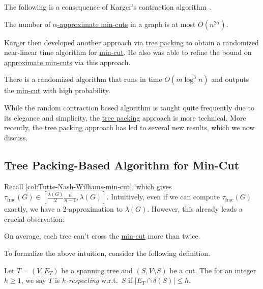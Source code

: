The following is a consequence of Karger's contraction algorithm~\cite{karger1995random}.

\begin{theorem}\label{thm:number-approximate-min-cut}
	The number of \hyperref[def:approximate-min-cut]{\(\alpha \)-approximate min-cuts} in a graph is at most \(O(n^{2 \alpha })\).
\end{theorem}

Karger then developed another approach via \hyperref[prb:TP]{tree packing} to obtain a randomized near-linear time algorithm for \hyperref[prb:global-min-cut]{min-cut}. He also was able to refine the bound on \hyperref[thm:number-approximate-min-cut]{approximate min-cuts} via this approach.

\begin{theorem}\label{thm:Karger-tree-packing-based-min-cut}
	There is a randomized algorithm that runs in time \(O(m \log ^3 n)\) and outputs the \hyperref[prb:global-min-cut]{min-cut} with high probability.
\end{theorem}

While the random contraction based algorithm is taught quite frequently due to its elegance and simplicity, the \hyperref[prb:TP]{tree packing} approach is more technical. More recently, the \hyperref[prb:TP]{tree packing} approach has led to several new results, which we now discuss.

\subsection{Tree Packing-Based Algorithm for Min-Cut}
Recall \autoref{col:Tutte-Nash-Williams-min-cut}, which gives \(\tau _{\text{frac} }(G) \in [\frac{\lambda (G)}{2} \frac{n}{n-1}, \lambda (G)]\). Intuitively, even if we can compute \(\tau _{\text{frac} }(G)\) exactly, we have a \(2\)-approximation to \(\lambda (G)\). However, this already leads a crucial observation:

\begin{intuition}
	On average, each tree can't cross the \hyperref[prb:global-min-cut]{min-cut} more than twice.
\end{intuition}

To formalize the above intuition, consider the following definition.

\begin{definition}[Respecting]\label{def:respect}
	Let \(T = (V, E_T)\) be a \hyperref[def:spanning-tree]{spanning tree} and \((S, V\setminus S)\) be a cut. The for an integer \(h \geq 1\), we say \(T\) is \emph{\(h\)-respecting} w.r.t.\ \(S\) if \(\lvert E_T \cap \delta (S) \rvert \leq h\).
\end{definition}

